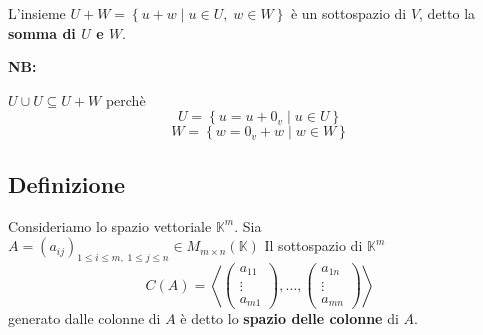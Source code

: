 \documentclass[a4paper]{article}
\theoremstyle{break}
\theoremstyle{break}
\theoremstyle{break}
\theoremstyle{break}
\begin{document}
\noindent L'insieme \( U + W = \left\{ u + w \; |\; u \in U,\; w \in W \right\}  \) è
un sottospazio di \( V \), detto la \textbf{somma di \( U \) e \( W \)}.

\vspace{1em}
\noindent \textbf{NB:}

\noindent \( U \cup U \subseteq U + W \) perchè
\[
U = \left\{ u = u + 0_v \;|\; u \in U \right\}
\] 
\[
W = \left\{ w = 0_v + w \;|\; w \in W \right\}
\] 
\subsection{Definizione}
Consideriamo lo spazio vettoriale \( \mathbb{K}^m \). Sia \( A = (a_{ij})_{1 \le i \le m,\; 1 \le j \le n} \in M_{m \times n}(\mathbb{K}) \) 
Il sottospazio di \( \mathbb{K}^m \) 
\[
  C(A) = \left< \begin{pmatrix} a_{11} \\ \vdots \\ a_{m1} \end{pmatrix}, \ldots, \begin{pmatrix} a_{1n} \\ \vdots \\ a_{mn} \end{pmatrix} \right>
\] 
generato dalle colonne di \( A \) è detto lo \textbf{spazio delle colonne} di \( A \).
\end{document}
